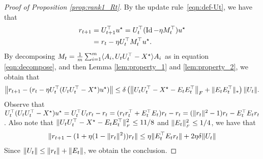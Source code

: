 \begin{proof}[Proof of Proposition \ref{prop:rank1_Rt}]
By the update rule~\eqref{eqn:def-Ut}, we have that 
	\begin{align*}
		r_{t+1} &= U_{t+1}^{\top} {u^{\star}} = U_t^{\top} (\operatorname{Id} -\eta M_t^{\top}) {u^{\star}} \nonumber\\
			&= r_t - \eta U_t^{\top} M_t^{\top} {u^{\star}}.
				\end{align*}
	By decomposing $M_t = \frac 1 m \sum_{i=1}^m \langle A_i, U_t U_t^{\top} - {X}^\star\rangle A_i$ as in equation \eqref{eqn:decompose},
	and then Lemma \ref{lem:property_1} and \ref{lem:property_2}, we obtain that
	\begin{align*}
		\left\|r_{t+1} - (r_t - \eta U_t^{\top} (U_t U_t^{\top} - {X}^\star) {u^{\star}})\right\|
		\le \delta \left(\left\|U_t U_t^{\top} - {X}^\star - E_t E_t^{\top}\right\|_{F} + \|E_t E_t^{\top}\|_{*} \right) \|U_t\|.
	\end{align*}
	Observe that $U_t^{\top} (U_t U_t^{\top} - {X}^\star) {u^{\star}} = U_t^{\top} U_t r_t - r_t = (r_t r_t^{\top} + E_t^{\top} E_t) r_t - r_t
	= (\|r_t\|^2 - 1) r_t - E_t^{\top} E_t r_t$.
	Also note that
	$\|U_t U_t^{\top} - {X}^\star - E_t E_t^{\top}\|_{_{F}}^2 \le 11/8$ and $\|E_t\|_{_{F}}^2 \le 1/4$, we have that
	\begin{align*}
		\|r_{t+1} - (1 + \eta(1 - \|r_t\|^2)) r_t\|
		\le \eta \|E_t^{\top}E_t r_t\| +
		2\eta\delta \|U_t\|
	\end{align*}
	Since $\|U_t\| \le \|r_t\| + \|E_t\|$,
	we obtain the conclusion.
\end{proof}




